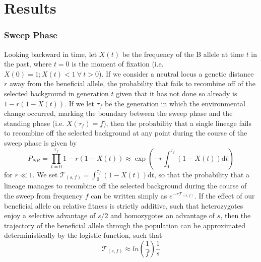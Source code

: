 \documentclass[a4paper,10pt]{article}
\begin{document}
\section{Results}

\subsubsection{Sweep Phase}

Looking backward in time, let $X\left(t\right)$ be the frequency of the B allele at time $t$ in the past, where $t=0$ is the moment of fixation (i.e. $X\left(0\right) = 1; X\left(t\right) < 1\ \forall\ t > 0$). If we consider a neutral locus a genetic distance $r$ away from the beneficial allele, the probability that  fails to recombine off of the selected background in generation $t$ given that it has not done so already is $1-r\left(1-X(t)\right)$. If we let $\tau_{f}$ be the generation in which the environmental change occurred, marking the boundary between the sweep phase and the standing phase (i.e. $X\left(\tau_{f}\right) = f$), then the probability that a single lineage fails to recombine off the selected background at any point during the course of the sweep phase is given by
\begin{equation}
P_{NR} = \prod_{t=0}^{\tau_{f}} 1-r\left(1-X(t)\right)  \approx \exp \left(-r \int_0^{\tau_{f}}(1-X\left(t\right))\mathrm{d} t \right)
\end{equation}
for $r \ll 1$. We set  $\mathcal{T}_{\left(s,f\right)} = \int_0^{\tau_{f}}(1-X\left(t\right))\mathrm{d}t$, so that the probability that a lineage manages to recombine off the selected background during the course of the sweep from frequency $f$ can be written simply as $e^{-r\mathcal{T}_{\left(s,f\right)}}$. If the effect of our beneficial allele on relative fitness is strictly additive, such that heterozygotes enjoy a selective advantage of $s/2$ and homozygotes an advantage of $s$, then the trajectory of the beneficial allele through the population can be approximated deterministically by the logistic function, such that 
\begin{equation}
		\mathcal{T}_{\left(s,f\right)} \approx ln\left(\frac{1}{f}\right) \frac{1}{s}
\end{equation}
\end{document}
